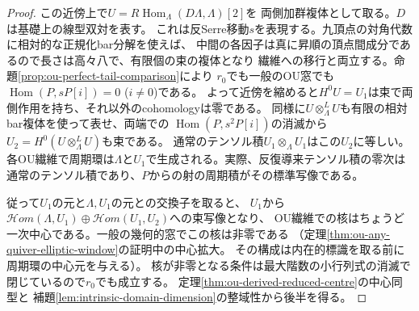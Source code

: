 \documentclass[11pt,a4paper]{ltjsarticle}
\theoremstyle{definition}
\begin{document}
\begin{proof}
この近傍上で$U=R\operatorname{Hom}_{\Lambda}(D\Lambda,\Lambda)[2]$を
両側加群複体として取る。$D$は基礎上の線型双対を表す。
これは反Serre移動$s$を表現する。九頂点の対角代数に相対的な正規化bar分解を使えば、
中間の各因子は真に昇順の頂点間成分であるので長さは高々八で、有限個の束の複体となり
繊維への移行と両立する。命題\ref{prop:ou-perfect-tail-comparison}により
$r_0$でも一般のOU窓でも$\operatorname{Hom}(P,sP[i])=0$ ($i\ne0$)である。
よって近傍を縮めると$H^0 U=U_1$は束で両側作用を持ち、それ以外のcohomologyは零である。
同様に$U\otimes^L_\Lambda U$も有限の相対bar複体を使って表せ、両端での
$\operatorname{Hom}(P,s^2P[i])$の消滅から$U_2=H^0(U\otimes^L_\Lambda U)$も束である。
通常のテンソル積$U_1\otimes_\Lambda U_1$はこの$U_2$に等しい。
各OU繊維で周期環は$\Lambda$と$U_1$で生成される。実際、反復導来テンソル積の零次は
通常のテンソル積であり、$P$からの射の周期積がその標準写像である。

従って$U_1$の元と$\Lambda,U_1$の元との交換子を取ると、
$U_1$から$\mathcal Hom(\Lambda,U_1)\oplus\mathcal Hom(U_1,U_2)$への束写像となり、
OU繊維での核はちょうど一次中心である。一般の幾何的窓でこの核は非零である
（定理\ref{thm:ou-any-quiver-elliptic-window}の証明中の中心拡大。
その構成は内在的標識を取る前に周期環の中心元を与える）。
核が非零となる条件は最大階数の小行列式の消滅で閉じているので$r_0$でも成立する。
定理\ref{thm:ou-derived-reduced-centre}の中心同型と
補題\ref{lem:intrinsic-domain-dimension}の整域性から後半を得る。
\end{proof}
\end{document}
